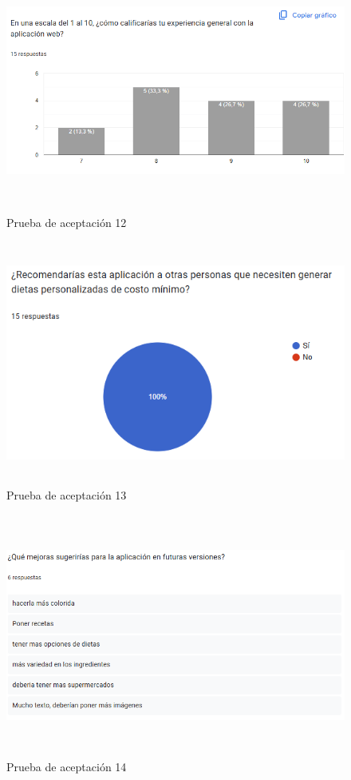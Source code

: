 \begin{figure}[H]
    \centering
    \includegraphics[height=8cm]{img/validacion/aceptacion12.png}
    \caption{Prueba de aceptaci\'on 12}
    \label{fig:aceptacion12}
\end{figure}

\begin{figure}[H]
    \centering
    \includegraphics[height=8cm]{img/validacion/aceptacion13.png}
    \caption{Prueba de aceptaci\'on 13}
    \label{fig:aceptacion13}
\end{figure}

\begin{figure}[H]
    \centering
    \includegraphics[height=8cm]{img/validacion/aceptacion14.png}
    \caption{Prueba de aceptaci\'on 14}
    \label{fig:aceptacion14}
\end{figure}

